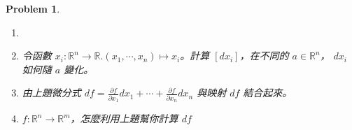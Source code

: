 \documentclass[10pt,a4paper]{article}
\newcounter{theProblemCounter}
\newtheorem{problem}[theProblemCounter]{Problem}
\begin{document}
\setcounter{theProblemCounter}{7}
\begin{problem}
\begin{enumerate}
\item[]
\item[(a)] 令函數 $x_i:\mathbb{R}^n\to \mathbb{R}. (x_1,\cdots, x_n)\mapsto x_i$。計算 $[dx_i]$，在不同的 $a\in \mathbb{R}^n$， $dx_i$ 如何隨 $a$ 變化。
\item[(b)] 由上題微分式 $df=\frac{\partial f}{\partial x_1} dx_1 + \cdots + \frac{\partial f}{\partial x_n} dx_n$ 與映射 $df$ 結合起來。
\item[(c)] $f:\mathbb{R}^n\to \mathbb{R}^m$，怎麼利用上題幫你計算 $df$
\end{enumerate}
\end{problem}
\end{document}
